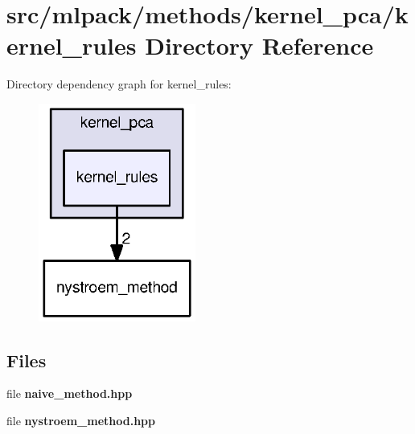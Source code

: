 \section{src/mlpack/methods/kernel\+\_\+pca/kernel\+\_\+rules Directory Reference}
\label{dir_702d0be5535d6df644d10e1014296a0d}
Directory dependency graph for kernel\+\_\+rules\+:
\nopagebreak
\begin{figure}[H]
\begin{center}
\leavevmode
\includegraphics[width=146pt]{dir_702d0be5535d6df644d10e1014296a0d_dep}
\end{center}
\end{figure}
\subsection*{Files}
\begin{DoxyCompactItemize}
\item 
file {\bf naive\+\_\+method.\+hpp}
\item 
file {\bf nystroem\+\_\+method.\+hpp}
\end{DoxyCompactItemize}
